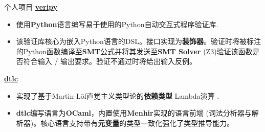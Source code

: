 \documentclass{resume}
\begin{document}
\begin{rSection}{个人项目}
		\textbf{\href{https://github.com/AD1024/veripy}{veripy}} %
		\vspace{-5pt}

		\begin{itemize}
			\setlength{\itemsep}{1pt}
            \setlength{\parskip}{0pt}
			\setlength{\parsep}{0pt}
			\item 使用\textbf{Python}语言编写易于使用的Python自动交互式程序验证库.
			\item 该验证库核心为嵌入Python语言的DSL。接口实现为\textbf{装饰器}。验证时将被标注的Python函数编译至\textbf{SMT}公式并将其发送至\textbf{SMT Solver} (Z3)验证该函数是否符合输入 / 输出要求。验证不通过时将给出输入反例。
		\end{itemize}

		\textbf{\href{https://github.com/AD1024/dtlc}{dtlc}} %
		\vspace{-5pt}

		\begin{itemize}
			\setlength{\itemsep}{1pt}
            \setlength{\parskip}{0pt}
			\setlength{\parsep}{0pt}
			\item 实现了基于Martin-Löf直觉主义类型论的\textbf{依赖类型} Lambda演算 .
			\item \textbf{dtlc}编写语言为\textbf{OCaml}，内置使用\textbf{Menhir}实现的语言前端 (词法分析器与解析器)。核心语言支持带有\textbf{元变量}的类型一致化强化了类型推导能力。
		\end{itemize}


\end{rSection}
\end{document}
